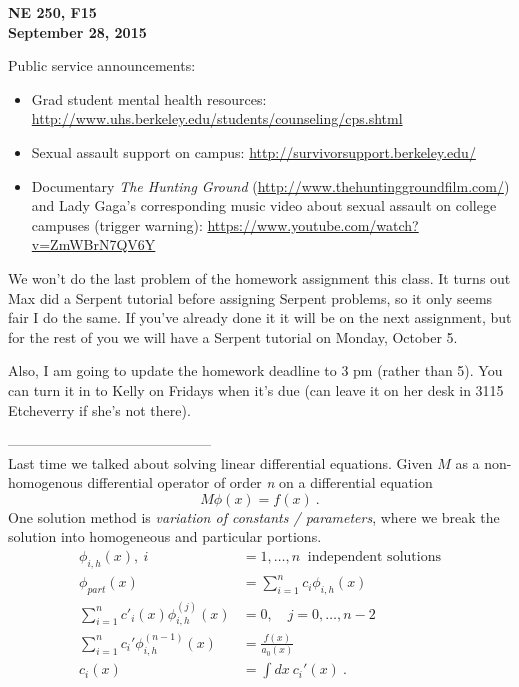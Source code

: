\documentclass[12pt]{article}
\begin{document}
\begin{center}
{\bf NE 250, F15\\
September 28, 2015 
}
\end{center}

Public service announcements: 
\begin{itemize}
\item Grad student mental health resources: \href{http://www.uhs.berkeley.edu/students/counseling/cps.shtml}{http://www.uhs.berkeley.edu/students/counseling/cps.shtml}
\item Sexual assault support on campus: \href{http://survivorsupport.berkeley.edu/}{http://survivorsupport.berkeley.edu/}
\item Documentary \textit{The Hunting Ground} (\href{http://www.thehuntinggroundfilm.com/}{http://www.thehuntinggroundfilm.com/}) and Lady Gaga's corresponding music video about sexual assault on college campuses (trigger warning): \href{https://www.youtube.com/watch?v=ZmWBrN7QV6Y}{https://www.youtube.com/watch?v=ZmWBrN7QV6Y}
\end{itemize}

We won't do the last problem of the homework assignment this class. It turns out Max did a Serpent tutorial before assigning Serpent problems, so it only seems fair I do the same. If you've already done it it will be on the next assignment, but for the rest of you we will have a Serpent tutorial on Monday, October 5.

Also, I am going to update the homework deadline to 3 pm (rather than 5).
You can turn it in to Kelly on Fridays when it's due (can leave it on her desk in 3115 Etcheverry if she's not there).

--------------------------------------------\\
Last time we talked about solving linear differential equations. 
Given $M$ as a non-homogenous differential operator of order \emph{n} on a differential equation
%
\begin{equation*}
M\phi(x) = f(x) \:.
\end{equation*}
%
One solution method is \textit{variation of constants / parameters}, where we break the solution into homogeneous and particular portions.
\begin{align*}
\phi_{i,h}(x),  \:i &= 1,\dotsc, n \:\text{ independent solutions} \\
\phi_{part}(x) &= \sum_{i=1}^n c_i\phi_{i,h}(x)\\
\sum_{i=1}^n c'_i(x) \phi^{(j)}_{i,h}(x) &= 0, \quad j = 0, \dots, n-2 \\
\sum_{i=1}^n c_i'\phi^{(n-1)}_{i,h}(x) &= \frac{f(x)}{a_0(x)} \\
c_i(x)& = \int dx\:c_i'(x) \:.
\end{align*}
\end{document}
